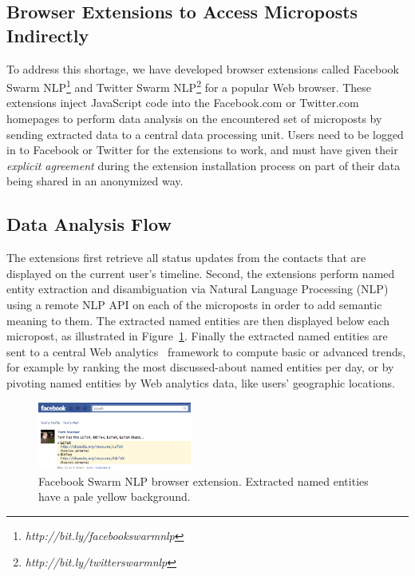 \subsection{Browser Extensions to Access Microposts Indirectly}
To address this shortage, we have developed browser extensions called Facebook Swarm NLP\footnote{\textit{http://bit.ly/facebookswarmnlp}} and Twitter Swarm NLP\footnote{\textit{http://bit.ly/twitterswarmnlp}} for a popular Web browser. These extensions inject JavaScript code into the Facebook.com or Twitter.com homepages to perform data analysis on the encountered set of microposts by sending extracted data to a central data processing unit.
Users need to be logged in to Facebook or Twitter for the extensions to work, and must have given their \emph{explicit agreement} during the extension installation process on part of their data being shared in an anonymized way.

\subsection{Data Analysis Flow}
The extensions first retrieve all status updates from the contacts that are displayed on the current user's timeline. Second, the extensions perform named entity extraction and disambiguation via Natural Language Processing (NLP) using a remote NLP API on each of the microposts in order to add semantic meaning to them. The extracted named entities are then displayed below each micropost, as illustrated in Figure~\ref{fig:facebook}. Finally the extracted named entities are sent to a central Web analytics~\cite{Kaushik} framework to compute basic or advanced trends, for example by ranking the most discussed-about named entities per day, or by pivoting named entities by Web analytics data, like users' geographic locations.

\begin{figure}[htb!]
  \centering
    \includegraphics[width=0.45\textwidth]{facebook-swarm-nlp.png}
  \caption{Facebook Swarm NLP browser extension. Extracted named entities have a pale yellow background.}     
  \label{fig:facebook}
\end{figure}

